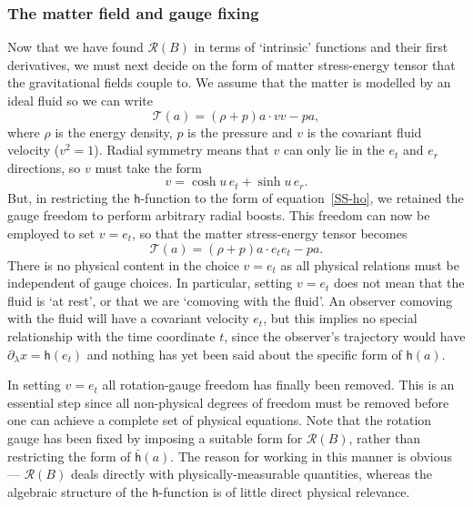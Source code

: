\documentclass[a4paper]{article}
\numberwithin{equation}{section}
\newcommand{\dt}{\! \cdot \!}
\newcommand{\lam}{\lambda}
\newcommand{\clr}{{\mathcal{R}}}
\newcommand{\clt}{{\mathcal{T}}}
\newcommand{\lih}{\mathsf{h}}
\newcommand{\lbh}{\bar{\mathsf{h}}}
\newcommand{\ho}{\lbh}
\newcommand{\hu}{\lih}
\begin{document}
\subsubsection*{The matter field and gauge fixing}

Now that we have found $\clr(B)$ in terms of `intrinsic' functions and
their first derivatives, we must next decide on the form of matter
stress-energy tensor that the gravitational fields couple to.  We
assume that the matter is modelled by an ideal fluid so we can write
%
\begin{equation}
\clt(a) = (\rho + p) a \dt v v - p a,
\end{equation}
%
where $\rho$ is the energy density, $p$ is the pressure and $v$ is the
covariant fluid velocity ($v^2=1$).  Radial symmetry means that $v$
can only lie in the $e_t$ and $e_r$ directions, so $v$ must take the
form
%
\begin{equation}
v = \cosh\!u\, e_t + \sinh\!u\, e_r .
\end{equation}
%
But, in restricting the $\lih$-function to the form of
equation~\eqref{SS-ho}, we retained the gauge freedom to perform arbitrary
radial boosts.  This freedom can now be employed to set $v=e_t$, so
that the matter stress-energy tensor becomes
%
\begin{equation}
\clt(a) = (\rho + p) a \dt e_t e_t - p a.
\label{SS-mat}
\end{equation}
%
There is no physical content in the choice $v=e_t$ as all physical
relations must be independent of gauge choices.  In particular,
setting $v=e_t$ does not mean that the fluid is `at rest', or that we
are `comoving with the fluid'.  An observer comoving with the fluid
will have a covariant velocity $e_t$, but this implies no special
relationship with the time coordinate $t$, since the observer's
trajectory would have $\partial_\lam x=\hu(e_t)$ and nothing has yet
been said about the specific form of $\hu(a)$.


In setting $v=e_t$ all rotation-gauge freedom has finally been
removed.  This is an essential step since all non-physical degrees of
freedom must be removed before one can achieve a complete set of
physical equations.  Note that the rotation gauge has been fixed by
imposing a suitable form for $\clr(B)$, rather than restricting the
form of $\ho(a)$.  The reason for working in this manner is obvious
--- $\clr(B)$ deals directly with physically-measurable quantities,
whereas the algebraic structure of the $\lih$-function is of little
direct physical relevance.
\end{document}
